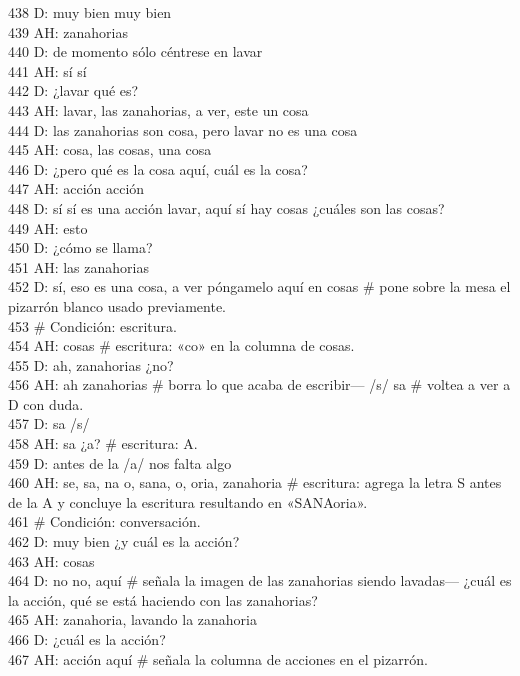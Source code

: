 438 D: muy bien muy bien\\
439 AH: zanahorias\\
440 D: de momento sólo céntrese en lavar\\
441 AH: sí sí\\
442 D: ¿lavar qué es?\\
443 AH: lavar, las zanahorias, a ver, este un cosa\\
444 D: las zanahorias son cosa, pero lavar no es una cosa\\
445 AH: cosa, las cosas, una cosa\\
446 D: ¿pero qué es la cosa aquí, cuál es la cosa?\\
447 AH: acción acción \\
448 D: sí sí es una acción lavar, aquí sí hay cosas ¿cuáles son las cosas?\\
449 AH: esto\\
450 D: ¿cómo se llama?\\
451 AH: las zanahorias\\
452 D: sí, eso es una cosa, a ver póngamelo aquí en cosas \# pone sobre la mesa el pizarrón blanco usado previamente.\\
453 \# Condición: escritura.\\
454 AH: cosas \# escritura: «co» en la columna de cosas.\\
455 D: ah, zanahorias ¿no?\\
456 AH: ah zanahorias \# borra lo que acaba de escribir--- /s/ sa \# voltea a ver a D con duda.\\
457 D: sa /s/\\
458 AH: sa ¿a? \# escritura: A.\\
459 D: antes de la /a/ nos falta algo\\
460 AH: se, sa, na o, sana, o, oria, zanahoria \# escritura: agrega la letra S antes de la A y concluye la escritura resultando en «SANAoria».\\
461 \# Condición: conversación.\\
462 D: muy bien ¿y cuál es la acción?\\
463 AH: cosas\\
464 D: no no, aquí \# señala la imagen de las zanahorias siendo lavadas--- ¿cuál es la acción, qué se está haciendo con las zanahorias?\\
465 AH: zanahoria, lavando la zanahoria\\
466 D: ¿cuál es la acción?\\
467 AH: acción aquí \# señala la columna de acciones en el pizarrón.\\
